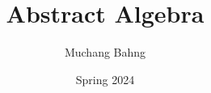 \documentclass{article}
\begin{document}
\title{Abstract Algebra}
\author{Muchang Bahng}
\date{Spring 2024}

\maketitle
\tableofcontents
\pagebreak 














\end{document}
